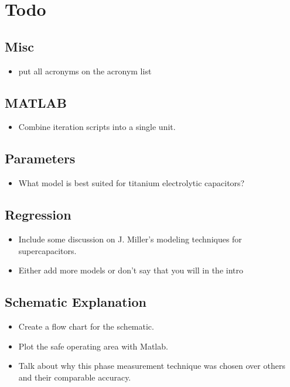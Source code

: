 \section{Todo}

\subsection{Misc}
\begin{itemize}
    \item put all acronyms on the acronym list
\end{itemize}

\subsection{MATLAB}
\begin{itemize}
    \item Combine iteration scripts into a single unit.
\end{itemize}

\subsection{Parameters}
\begin{itemize}
    \item What model is best suited for titanium electrolytic capacitors?
\end{itemize}

\subsection{Regression}
\begin{itemize}
    \item Include some discussion on J. Miller's modeling techniques for supercapacitors.
    \item Either add more models or don't say that you will in the intro
\end{itemize}

\subsection{Schematic Explanation}
\begin{itemize}
    \item Create a flow chart for the schematic.
    \item Plot the safe operating area with Matlab.
    \item Talk about why this phase measurement technique was chosen over others and their comparable accuracy.
\end{itemize}

